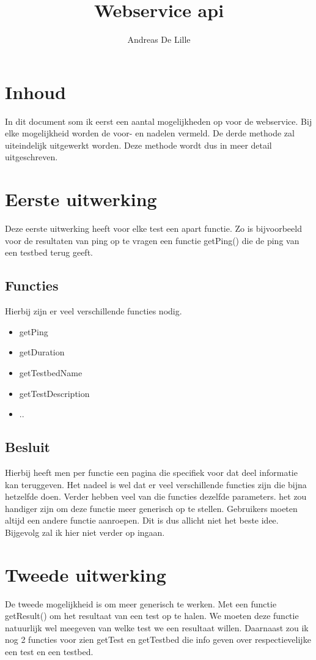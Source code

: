 \documentclass[11pt]{article}
\begin{document}
\title{Webservice api}
\author{Andreas De Lille}
\maketitle

\section{Inhoud}
In dit document som ik eerst een aantal mogelijkheden op voor de webservice. Bij elke mogelijkheid worden de voor- en nadelen vermeld. De derde methode zal uiteindelijk uitgewerkt worden. Deze methode wordt dus in meer detail uitgeschreven.

\section{Eerste uitwerking}
Deze eerste uitwerking heeft voor elke test een apart functie.
Zo is bijvoorbeeld voor de resultaten van ping op te vragen een functie getPing() die de ping van een testbed terug geeft.
\subsection{Functies}
Hierbij zijn er veel verschillende functies nodig.
\begin{itemize}
\item getPing
\item getDuration
\item getTestbedName
\item getTestDescription
\item ..
\end{itemize}
\subsection{Besluit}
Hierbij heeft men per functie een pagina die specifiek voor dat deel informatie kan teruggeven. Het nadeel is wel dat er veel verschillende functies zijn die bijna hetzelfde doen. Verder hebben veel van die functies dezelfde parameters. het zou handiger zijn om deze functie meer generisch op te stellen. 
Gebruikers moeten altijd een andere functie aanroepen. Dit is dus allicht niet het beste idee. Bijgevolg zal ik hier niet verder op ingaan.

\clearpage
\section{Tweede uitwerking}
De tweede mogelijkheid is om meer generisch te werken. Met een functie getResult() om het resultaat van een test op te halen. We moeten deze functie natuurlijk wel meegeven van welke test we een resultaat willen. Daarnaast zou ik nog 2 functies voor zien getTest en getTestbed die info geven over respectievelijke een test en een testbed.
\end{document}
